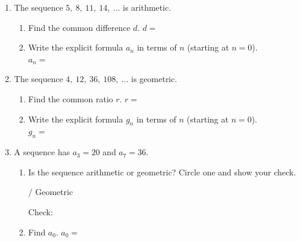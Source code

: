 \documentclass[10pt]{article}
\begin{document}
\namedateperiod

\vspace{0.14in}

\begin{enumerate}[itemsep=18pt]

\item The sequence $5,\ 8,\ 11,\ 14,\ \ldots$ is arithmetic.

      \begin{enumerate}[label=(\alph*), itemsep=8pt]
        \item Find the common difference $d$. \quad $d = $ 

        \item Write the explicit formula $a_n$ in terms of $n$ (starting at $n = 0$). \\[4pt]
              $a_n = $ 
      \end{enumerate}

\item The sequence $4,\ 12,\ 36,\ 108,\ \ldots$ is geometric.

      \begin{enumerate}[label=(\alph*), itemsep=8pt]
        \item Find the common ratio $r$. \quad $r = $ 

        \item Write the explicit formula $g_n$ in terms of $n$ (starting at $n = 0$). \\[4pt]
              $g_n = $ 
      \end{enumerate}

\item A sequence has $a_3 = 20$ and $a_7 = 36$.

      \begin{enumerate}[label=(\alph*), itemsep=8pt]
        \item Is the sequence arithmetic or geometric? Circle one and show your check.

              \medskip
               \quad / \quad Geometric

              \vspace{0.08in}
              Check: 

        \item Find $a_0$. \quad $a_0 = $ 
      \end{enumerate}

\end{enumerate}
\end{document}
